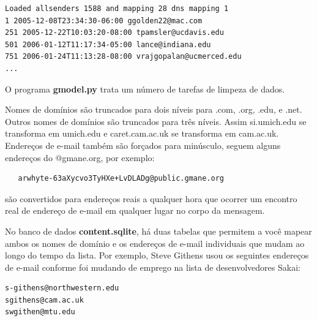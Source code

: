 \beforeverb
\begin{verbatim}
Loaded allsenders 1588 and mapping 28 dns mapping 1
1 2005-12-08T23:34:30-06:00 ggolden22@mac.com
251 2005-12-22T10:03:20-08:00 tpamsler@ucdavis.edu
501 2006-01-12T11:17:34-05:00 lance@indiana.edu
751 2006-01-24T11:13:28-08:00 vrajgopalan@ucmerced.edu
...
\end{verbatim}
\afterverb
%

O programa {\bf gmodel.py} trata um número de tarefas de limpeza de dados.

Nomes de domínios são truncados para dois níveis para .com, .org, .edu, e .net. 
Outros nomes de domínios são truncados para três níveis. Assim si.umich.edu
se transforma em umich.edu e caret.cam.ac.uk se transforma em cam.ac.uk.
Endereços de e-mail também são forçados para minúsculo, seguem alguns endereços
do @gmane.org, por exemplo:

\beforeverb
\begin{verbatim}
   arwhyte-63aXycvo3TyHXe+LvDLADg@public.gmane.org
\end{verbatim}
\afterverb
%

são convertidos para endereços reais a qualquer hora que ocorrer um encontro
real de endereço de e-mail em qualquer lugar no corpo da mensagem. 

No banco de dados {\bf content.sqlite}, há duas tabelas que permitem a você
mapear ambos os nomes de domínio e os endereços de e-mail individuais que mudam
ao longo do tempo da lista. Por exemplo, Steve Githens usou os seguintes endereços 
de e-mail conforme foi mudando de emprego na lista de desenvolvedores Sakai:

\beforeverb
\begin{verbatim}
s-githens@northwestern.edu
sgithens@cam.ac.uk
swgithen@mtu.edu
\end{verbatim}
\afterverb
%

